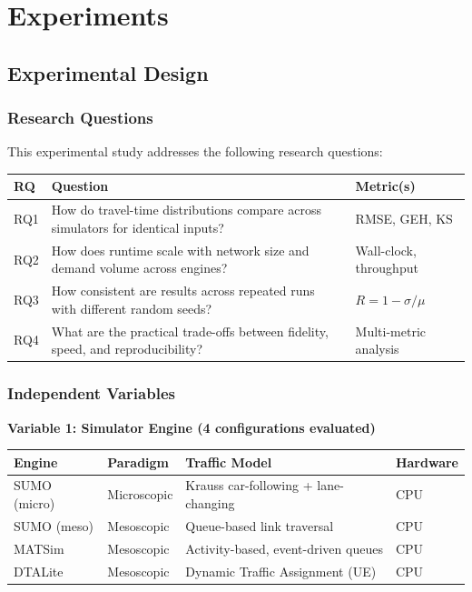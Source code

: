\chapter{Experiments}\label{chapter-4-experiments}

\section{Experimental Design}\label{41-experimental-design}

\subsection{Research Questions}\label{411-research-questions}

This experimental study addresses the following research questions:

\begin{longtable}[]{@{}lll@{}}
\toprule\noalign{}
RQ & Question & Metric(s) \\
\midrule\noalign{}
\endhead
\bottomrule\noalign{}
\endlastfoot
RQ1 & How do travel-time distributions compare across simulators for
identical inputs? & RMSE, GEH, KS \\
RQ2 & How does runtime scale with network size and demand volume across
engines? & Wall-clock, throughput \\
RQ3 & How consistent are results across repeated runs with different
random seeds? & \(R = 1 - \sigma/\mu\) \\
RQ4 & What are the practical trade-offs between fidelity, speed, and
reproducibility? & Multi-metric analysis \\
\end{longtable}

\subsection{Independent
Variables}\label{412-independent-variables}

\textbf{Variable 1: Simulator Engine (4 configurations evaluated)}

\begin{longtable}[]{@{}llll@{}}
\toprule\noalign{}
Engine & Paradigm & Traffic Model & Hardware \\
\midrule\noalign{}
\endhead
\bottomrule\noalign{}
\endlastfoot
SUMO (micro) & Microscopic & Krauss car-following + lane-changing &
CPU \\
SUMO (meso) & Mesoscopic & Queue-based link traversal & CPU \\
MATSim & Mesoscopic & Activity-based, event-driven queues & CPU \\
DTALite & Mesoscopic & Dynamic Traffic Assignment (UE) & CPU \\
\end{longtable}

